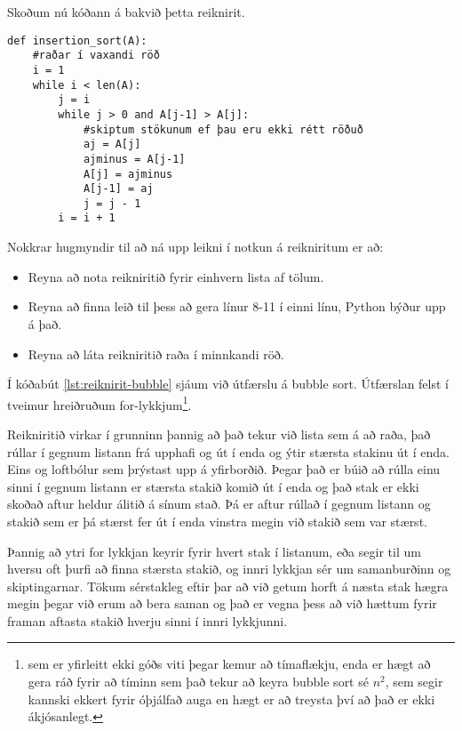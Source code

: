Skoðum nú kóðann á bakvið þetta reiknirit.

\begin{lstlisting}[caption=Insertion sort reikniritið, label=lst:reiknirit-insertion]
def insertion_sort(A):
	#raðar í vaxandi röð
	i = 1
	while i < len(A):
		j = i
		while j > 0 and A[j-1] > A[j]:
			#skiptum stökunum ef þau eru ekki rétt röðuð
			aj = A[j]
			ajminus = A[j-1]
			A[j] = ajminus
			A[j-1] = aj
			j = j - 1
		i = i + 1
\end{lstlisting}

Nokkrar hugmyndir til að ná upp leikni í notkun á reikniritum er að:
\begin{itemize}
	\item Reyna að nota reikniritið fyrir einhvern lista af tölum.
	\item Reyna að finna leið til þess að gera línur 8-11 í einni línu, Python býður upp á það.
	\item Reyna að láta reikniritið raða í minnkandi röð.
\end{itemize}

Í kóðabút \ref{lst:reiknirit-bubble} sjáum við útfærslu á bubble sort.
Útfærslan felst í tveimur hreiðruðum for-lykkjum\footnote{sem er yfirleitt ekki góðs viti þegar kemur að tímaflækju, enda er hægt að gera ráð fyrir að tíminn sem það tekur að keyra bubble sort sé $n^2$, sem segir kannski ekkert fyrir óþjálfað auga en hægt er að treysta því að það er ekki ákjósanlegt.}.

Reikniritið virkar í grunninn þannig að það tekur við lista sem á að raða, það rúllar í gegnum listann frá upphafi og út í enda og ýtir stærsta stakinu út í enda.
Eins og loftbólur sem þrýstast upp á yfirborðið.
Þegar það er búið að rúlla einu sinni í gegnum listann er stærsta stakið komið út í enda og það stak er ekki skoðað aftur heldur álitið á sínum stað.
Þá er aftur rúllað í gegnum listann og stakið sem er þá stærst fer út í enda vinstra megin við stakið sem var stærst.

Þannig að ytri for lykkjan keyrir fyrir hvert stak í listanum, eða segir til um hversu oft þurfi að finna stærsta stakið, og innri lykkjan sér um samanburðinn og skiptingarnar.
Tökum sérstakleg eftir þar að við getum horft á næsta stak hægra megin þegar við erum að bera saman og það er vegna þess að við hættum fyrir framan aftasta stakið hverju sinni í innri lykkjunni.


